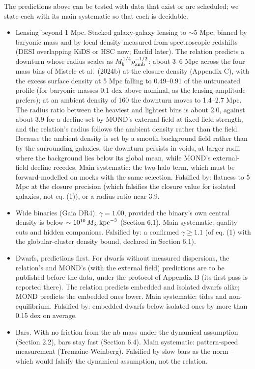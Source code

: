 \documentclass[
  10pt,
]{article}
\begin{document}
The predictions above can be tested with data that exist or are scheduled; we state each with its main systematic so that each is decidable.
\begin{itemize}
\item[(i)] Lensing beyond 1 Mpc. Stacked galaxy-galaxy lensing to $\sim$5 Mpc, binned by baryonic mass and by local density measured from spectroscopic redshifts (DESI overlapping KiDS or HSC now; Euclid later). The relation predicts a downturn whose radius scales as $M_b^{1/4}\rho_{\rm amb}^{-1/2}$: about 3--6 Mpc across the four mass bins of Mistele et al.~(2024b) at the closure density (Appendix C), with the excess surface density at 5 Mpc falling to 0.49--0.91 of the untruncated profile (for baryonic masses 0.1 dex above nominal, as the lensing amplitude prefers); at an ambient density of 160 the downturn moves to 1.4--2.7 Mpc. The radius ratio between the heaviest and lightest bins is about 2.0, against about 3.9 for a decline set by MOND's external field at fixed field strength, and the relation's radius follows the ambient density rather than the field. Because the ambient density is set by a smooth background field rather than by the surrounding galaxies, the downturn persists in voids, at larger radii where the background lies below its global mean, while MOND's external-field decline recedes. Main systematic: the two-halo term, which must be forward-modelled on mocks with the same selection. Falsified by: flatness to 5 Mpc at the closure precision (which falsifies the closure value for isolated galaxies, not eq. (1)), or a radius ratio near 3.9.
\item[(ii)] Wide binaries (Gaia DR4). $\gamma=1.00$, provided the binary's own central density is below $\sim10^{10}\,M_\odot\,{\rm kpc}^{-3}$ (Section 6.1). Main systematic: quality cuts and hidden companions. Falsified by: a confirmed $\gamma\ge1.1$ (of eq. (1) with the globular-cluster density bound, declared in Section 6.1).
\item[(iii)] Dwarfs, predictions first. For dwarfs without measured dispersions, the relation's and MOND's (with the external field) predictions are to be published before the data, under the protocol of Appendix B (its first pass is reported there). The relation predicts embedded and isolated dwarfs alike; MOND predicts the embedded ones lower. Main systematic: tides and non-equilibrium. Falsified by: embedded dwarfs below isolated ones by more than 0.15 dex on average.
\item[(iv)] Bars. With no friction from the nb mass under the dynamical assumption (Section 2.2), bars stay fast (Section 6.4). Main systematic: pattern-speed measurement (Tremaine-Weinberg). Falsified by slow bars as the norm -- which would falsify the dynamical assumption, not the relation.
\end{itemize}
\end{document}
